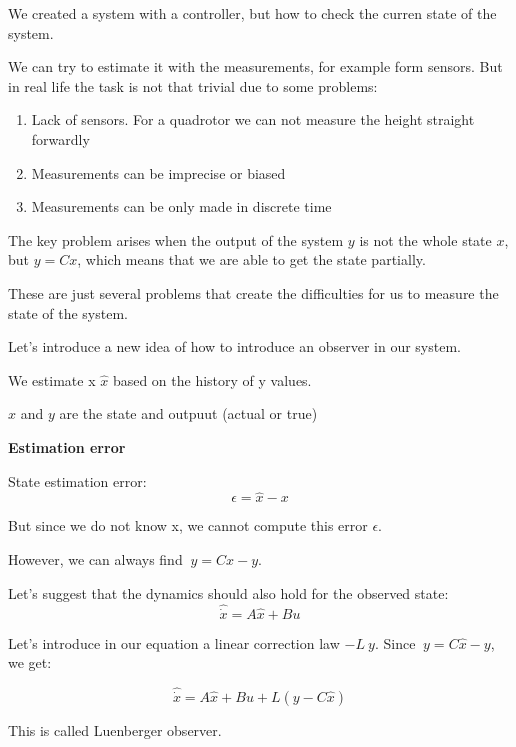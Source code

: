 We created a system with a controller, but how to check the curren state of the system.

We can try to estimate it with the measurements, for example form sensors. But in real life 
the task is not that trivial due to some problems:

\begin{enumerate}
    \item Lack of sensors. For a quadrotor we can not measure the height straight forwardly 
    \item Measurements can be imprecise or biased
    \item Measurements can be only made in discrete time
\end{enumerate}

The key problem arises when the output of the system $y$ is not the whole state $x$, but $y = Cx$, which
means that we are able to get the state partially.

These are just several problems that create the difficulties for us to measure the state of the system. 


Let's introduce a new idea of how to introduce an observer in our system. 


We estimate x $\hat x$ based on the history of y values. 


$x$ and $y$ are the state and outpuut (actual or true)

\textbf{Estimation error}

State estimation error:
\[\epsilon = \hat x - x\]

But since we do not know x, we cannot compute this error $\epsilon$.

However, we can always find $~ y = C \hat x - y$. 

Let's suggest that the dynamics should also hold for the observed state:
\[\hat \dot x = A \hat x + Bu\]

Let's introduce in our equation a linear correction law $-L ~y$. 
Since $~y = C \hat x - y$, we get:

\begin{equation}
    \hat \dot x = A \hat x + Bu + L(y - C \hat x) 
\end{equation}

This is called Luenberger observer.  

